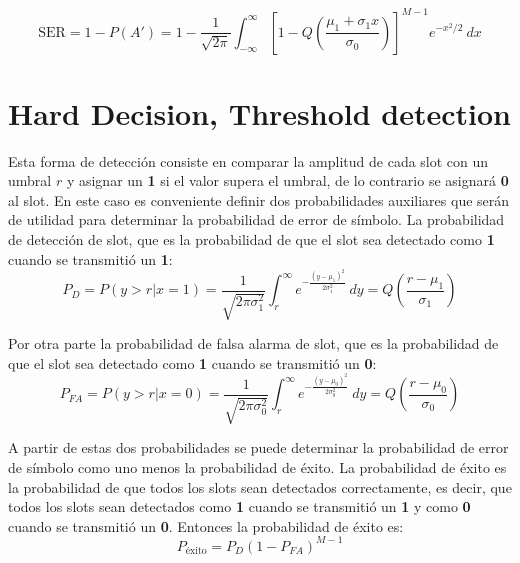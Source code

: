 \documentclass{article}
\begin{document}
            \begin{tcolorbox}[colback=yellow!20!white,colframe=black]
                \begin{equation}
                    \text{SER} = 1-P(A') = 1-\frac{1}{\sqrt{2\pi}}\int_{-\infty}^{\infty} \left[1-Q\left( \frac{\mu_1 + \sigma_1 x}{\sigma_0} \right)\right]^{M-1} e^{-x^2/2}\:dx
                \end{equation}
            \end{tcolorbox}
            
            
\section{Hard Decision, Threshold detection}
    Esta forma de detección consiste en comparar la amplitud de cada slot con un umbral $r$
    y asignar un \textbf{1} si el valor supera el umbral, de lo contrario se asignará
    \textbf{0} al slot. En este caso es conveniente definir dos probabilidades auxiliares que serán de utilidad
    para determinar la probabilidad de error de símbolo. La probabilidad de detección de slot,
    que es la probabilidad de que el slot sea detectado como \textbf{1} cuando se transmitió un \textbf{1}:
    \begin{equation}
        P_{D} = P(y>r|x=1) = \frac{1}{\sqrt{2\pi\sigma_1^2}}\int_{r}^{\infty} e^{-\frac{(y-\mu_1)^2}{2\sigma_1^2}}\:dy=Q\left(\frac{r-\mu_1}{\sigma_1}\right)
    \end{equation}
    
    Por otra parte la probabilidad de falsa alarma de slot, que es la probabilidad de que el slot sea detectado como \textbf{1} cuando se transmitió un \textbf{0}:
    \begin{equation}
        P_{FA} = P(y>r|x=0) = \frac{1}{\sqrt{2\pi\sigma_0^2}}\int_{r}^{\infty} e^{-\frac{(y-\mu_0)^2}{2\sigma_0^2}}\:dy=Q\left(\frac{r-\mu_0}{\sigma_0}\right)
    \end{equation}
    
    A partir de estas dos probabilidades se puede determinar la probabilidad de error de símbolo como 
    uno menos la probabilidad de éxito. La probabilidad de éxito es la probabilidad de que todos los slots sean detectados correctamente,
    es decir, que todos los slots sean detectados como \textbf{1} cuando se transmitió un \textbf{1} y como \textbf{0} cuando se transmitió un \textbf{0}.
    Entonces la probabilidad de éxito es:
    \begin{equation}
        P_\text{éxito} = P_{D}(1-P_{FA})^{M-1}
    \end{equation}
    
\end{document}
